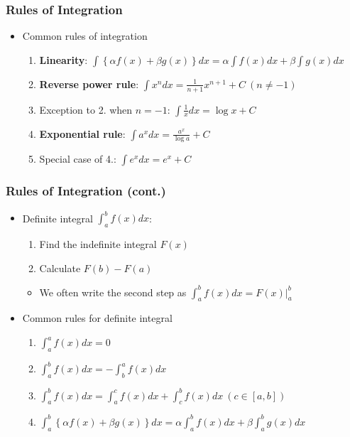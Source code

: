 \documentclass[pdflatex, 12pt]{beamer}
\begin{document}
\begin{frame}
\frametitle{Rules of Integration}
\begin{itemize}
\item Common rules of integration
 \begin{enumerate}
 \item \textbf{Linearity}: $\int \left\{\alpha f(x) + \beta g(x) \right\}dx = \alpha \int f(x)dx + \beta \int g(x)dx$
 \vspace{0.1cm}
 \item \textbf{Reverse power rule}: $\int x^n dx = \frac{1}{n + 1} x^{n + 1} + C \ (n \neq -1)$
 \vspace{0.1cm}
 \item Exception to 2. when $n = -1$: $\int \frac{1}{x} dx = \log x + C$
 \vspace{0.1cm}
 \item \textbf{Exponential rule}: $\int a^x dx = \frac{a^x}{\log a} + C$
 \vspace{0.1cm}
 \item Special case of 4.: $\int e^x dx = e^x + C$
 \end{enumerate}
\end{itemize}
\end{frame}

\begin{frame}
\frametitle{Rules of Integration (cont.)}
\begin{itemize}
\item Definite integral $\int^b_a f(x) dx$:
 \begin{enumerate}
 \item Find the indefinite integral $F(x)$
 \item Calculate $F(b) - F(a)$
 \end{enumerate}
 \begin{itemize}
 \item We often write the second step as $\int^b_a f(x) dx = F(x)|^b_a$
 \end{itemize}
\vspace{0.4cm}
\item Common rules for definite integral
 \begin{enumerate}
 \item $\int^a_a f(x) dx = 0$
 \item $\int^b_a f(x) dx = -\int^a_b f(x) dx$
 \item $\int^b_a f(x) dx = \int_a^c f(x) dx + \int^b_c f(x) dx \ (c \in [a, b])$
 \item $\int^b_a \left\{\alpha f(x) + \beta g(x)\right\} dx = \alpha \int^b_a f(x) dx + \beta \int^b_a g(x) dx$
 \end{enumerate}
\end{itemize}
\end{frame}
\end{document}
